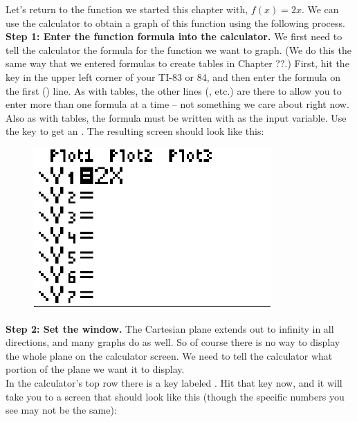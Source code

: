 Let’s return to the function we started this chapter with, $f(x)=2x$. We can use the calculator to obtain a graph of this function using the following process.\\

\textbf{Step 1: Enter the function formula into the calculator.} We first need to tell the calculator the formula for the function we want to graph. (We do this the same way that we entered formulas to create tables in Chapter ??.) First, hit the  key in the upper left corner of your TI-83 or 84, and then enter the formula on the first () line. As with tables, the other lines (,  etc.) are there to allow you to enter more than one formula at a time – not something we care about right now. Also as with tables, the formula must be written with  as the input variable. Use the  key to get an . The resulting screen should look like this:

\begin{figure}[H]
	\centering
	\includegraphics[scale=1.0]{Sections/FunctionsandGraphsImages/Figure19.png}
\end{figure}

 \textbf{Step 2: Set the window.} The Cartesian plane extends out to infinity in all directions, and many graphs do as well. So of course there is no way to display the whole plane on the calculator screen.  We need to tell the calculator what portion of the plane we want it to display. \\

In the calculator’s top row there is a key labeled . Hit that key now, and it will take you to a screen that should look like this (though the specific numbers you see may not be the same):

